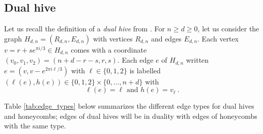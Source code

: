 \documentclass[11pt,a4paper]{amsart}
\numberwithin{equation}{section}
\theoremstyle{definition}
\begin{document}
\subsection{Dual hive}
\label{subsec:dual_hive}

Let us recall the definition of a \textit{dual hive} from 
\cite{françois2024positiveformulaproductconjugacy}. 
For $n \geqslant d \geqslant 0$, let us consider the graph 
$H_{d, n} = (R_{d, n}, E_{d, n})$ with vertices $R_{d, n}$ and edges $E_{d, n}$. 
Each vertex $v=r+se^{\pi i/3}\in H_{d,n}$ comes with a coordinate 
$(v_0,v_1,v_2)=(n+d-r-s,r,s)$. 
Each edge $e$ of $H_{d,n}$ written  $e=(v,v - e^{2\pi i\ell/3})$ with $\ell\in\{0,1,2\}$ is 
labelled $(\ell(e),h(e))\in\{0,1,2\}\times \{0,\ldots,n+d\}$ with 
\begin{equation}
    \label{eq:def_type_height_dual_hive}
    \ell(e)=\ell \text{ and } h(e)= v_{\ell} \ .
\end{equation}

\noindent
Table \ref{tab:edge_types} below summarizes the different edge types for dual hives 
and honeycombs; edges of dual hives will be in duality with edges of honeycombs with the same type. 
\end{document}
